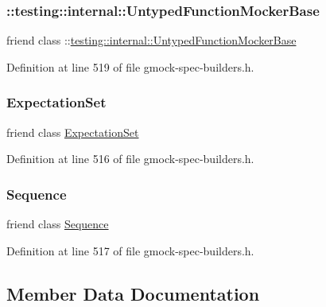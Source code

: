 \subsubsection{\texorpdfstring{\+::testing\+::internal\+::\+Untyped\+Function\+Mocker\+Base}{::testing::internal::UntypedFunctionMockerBase}}
{\footnotesize\ttfamily friend class \+::\hyperlink{classtesting_1_1internal_1_1UntypedFunctionMockerBase}{testing\+::internal\+::\+Untyped\+Function\+Mocker\+Base}\hspace{0.3cm}{\ttfamily [friend]}}



Definition at line 519 of file gmock-\/spec-\/builders.\+h.

\mbox{\label{classtesting_1_1Expectation_acf5c2877a449d4ad1889ee5833ebb193}} 
\subsubsection{\texorpdfstring{Expectation\+Set}{ExpectationSet}}
{\footnotesize\ttfamily friend class \hyperlink{classtesting_1_1ExpectationSet}{Expectation\+Set}\hspace{0.3cm}{\ttfamily [friend]}}



Definition at line 516 of file gmock-\/spec-\/builders.\+h.

\mbox{\label{classtesting_1_1Expectation_a26271d5afaff6e6d3f00c055c63d0b24}} 
\subsubsection{\texorpdfstring{Sequence}{Sequence}}
{\footnotesize\ttfamily friend class \hyperlink{classtesting_1_1Sequence}{Sequence}\hspace{0.3cm}{\ttfamily [friend]}}



Definition at line 517 of file gmock-\/spec-\/builders.\+h.



\subsection{Member Data Documentation}
\mbox{\label{classtesting_1_1Expectation_a96caf8f40e769b68ea010c098f7190fa}} 
